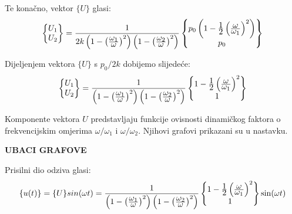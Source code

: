 Te konačno, vektor $\{U\}$ glasi:
\begin{equation}\label{eq:vektor_u_konacno}
    \begin{Bmatrix}
        U_1\\
        U_2
    \end{Bmatrix}
    =
    \frac{1}{2k\left(1-\left(\frac{\displaystyle \omega_1}{\displaystyle \omega}\right)^2\right)\left(1-\left(\frac{\displaystyle \omega_2}{\displaystyle \omega}\right)^2\right)}
    \begin{Bmatrix}
        p_0\left(1-\frac{\displaystyle 1}{\displaystyle 2}\left(\frac{\displaystyle \omega}{\displaystyle \omega_1}\right)^2\right)\\
        p_0 
    \end{Bmatrix}
\end{equation}

Dijeljenjem vektora $\{U\}$ s $p_0/2k$ dobijemo slijedeće:
\begin{equation}
    \begin{Bmatrix}
        U_1\\
        U_2
    \end{Bmatrix}
    =
    \frac{1}{\left(1-\left(\frac{\displaystyle \omega_1}{\displaystyle \omega}\right)^2\right)\left(1-\left(\frac{\displaystyle \omega_2}{\displaystyle \omega}\right)^2\right)}
    \begin{Bmatrix}
        1-\frac{\displaystyle 1}{\displaystyle 2}\left(\frac{\displaystyle \omega}{\displaystyle \omega_1}\right)^2\\
        1 
    \end{Bmatrix}
\end{equation}


Komponente vektora $U$ predstavljaju funkcije ovisnosti dinamičkog faktora o 
frekvencijskim omjerima $\omega/\omega_1$ i $\omega/\omega_2$. Njihovi grafovi
prikazani su u nastavku.

\textbf{UBACI GRAFOVE}

Prisilni dio odziva glasi:
\begin{equation}
    \begin{split}
        \{u(t)\} = \{U\} sin(\omega t)
        =
        \frac{1}{\left(1-\left(\frac{\displaystyle \omega_1}{\displaystyle \omega}\right)^2\right)\left(1-\left(\frac{\displaystyle \omega_2}{\displaystyle \omega}\right)^2\right)}
    \begin{Bmatrix}
        1-\frac{\displaystyle 1}{\displaystyle 2}\left(\frac{\displaystyle \omega}{\displaystyle \omega_1}\right)^2\\
        1 
    \end{Bmatrix}
    \sin(\omega t)
    \end{split}
\end{equation}

